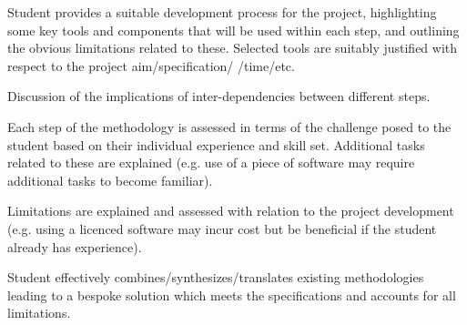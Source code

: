 Student provides a suitable development process for the project, highlighting some key tools and components that will be used within each step, and outlining the obvious limitations related to these. Selected tools are suitably justified with respect to the project aim/specification/ /time/etc.

Discussion of the implications of inter-dependencies between different steps.

Each step of the methodology is assessed in terms of the challenge posed to the student based on their individual experience and skill set. Additional tasks related to these are explained (e.g. use of a piece of software may require additional tasks to become familiar).

Limitations are explained and assessed with relation to the project development (e.g. using a licenced software may incur cost but be beneficial if the student already has experience).

Student effectively combines/synthesizes/translates existing methodologies leading to a bespoke solution which meets the specifications and accounts for all limitations.
